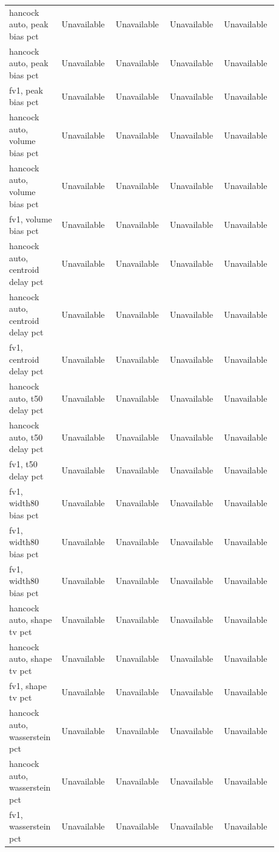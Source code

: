 \begin{longtable}{p{0.1760\linewidth}p{0.1760\linewidth}p{0.1760\linewidth}p{0.1760\linewidth}p{0.1760\linewidth}}
hancock auto, peak bias pct & Unavailable & Unavailable & Unavailable & Unavailable \\
hancock auto, peak bias pct & Unavailable & Unavailable & Unavailable & Unavailable \\
fv1, peak bias pct & Unavailable & Unavailable & Unavailable & Unavailable \\
hancock auto, volume bias pct & Unavailable & Unavailable & Unavailable & Unavailable \\
hancock auto, volume bias pct & Unavailable & Unavailable & Unavailable & Unavailable \\
fv1, volume bias pct & Unavailable & Unavailable & Unavailable & Unavailable \\
hancock auto, centroid delay pct & Unavailable & Unavailable & Unavailable & Unavailable \\
hancock auto, centroid delay pct & Unavailable & Unavailable & Unavailable & Unavailable \\
fv1, centroid delay pct & Unavailable & Unavailable & Unavailable & Unavailable \\
hancock auto, t50 delay pct & Unavailable & Unavailable & Unavailable & Unavailable \\
hancock auto, t50 delay pct & Unavailable & Unavailable & Unavailable & Unavailable \\
fv1, t50 delay pct & Unavailable & Unavailable & Unavailable & Unavailable \\
fv1, width80 bias pct & Unavailable & Unavailable & Unavailable & Unavailable \\
fv1, width80 bias pct & Unavailable & Unavailable & Unavailable & Unavailable \\
fv1, width80 bias pct & Unavailable & Unavailable & Unavailable & Unavailable \\
hancock auto, shape tv pct & Unavailable & Unavailable & Unavailable & Unavailable \\
hancock auto, shape tv pct & Unavailable & Unavailable & Unavailable & Unavailable \\
fv1, shape tv pct & Unavailable & Unavailable & Unavailable & Unavailable \\
hancock auto, wasserstein pct & Unavailable & Unavailable & Unavailable & Unavailable \\
hancock auto, wasserstein pct & Unavailable & Unavailable & Unavailable & Unavailable \\
fv1, wasserstein pct & Unavailable & Unavailable & Unavailable & Unavailable \\

\end{longtable}
